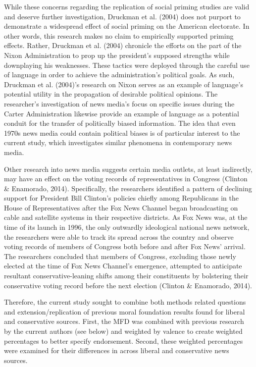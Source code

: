 \documentclass[english,,man]{apa6}
\begin{document}
While these concerns regarding the replication of social priming studies
are valid and deserve further investigation, Druckman et al. (2004) does
not purport to demonstrate a widespread effect of social priming on the
American electorate. In other words, this research makes no claim to
empirically supported priming effects. Rather, Druckman et al. (2004)
chronicle the efforts on the part of the Nixon Administration to prop up
the president's supposed strengths while downplaying his weaknesses.
These tactics were deployed through the careful use of language in order
to achieve the administration's political goals. As such, Druckman et
al. (2004)'s research on Nixon serves as an example of language's
potential utility in the propagation of desirable political opinions.
The researcher's investigation of news media's focus on specific issues
during the Carter Administration likewise provide an example of language
as a potential conduit for the transfer of politically biased
information. The idea that even 1970s news media could contain political
biases is of particular interest to the current study, which
investigates similar phenomena in contemporary news media.

Other research into news media suggests certain media outlets, at least
indirectly, may have an effect on the voting records of representatives
in Congress (Clinton \& Enamorado, 2014). Specifically, the researchers
identified a pattern of declining support for President Bill Clinton's
policies chiefly among Republicans in the House of Representatives after
the Fox News Channel began broadcasting on cable and satellite systems
in their respective districts. As Fox News was, at the time of its
launch in 1996, the only outwardly ideological national news network,
the researchers were able to track its spread across the country and
observe voting records of members of Congress both before and after Fox
News' arrival. The researchers concluded that members of Congress,
excluding those newly elected at the time of Fox News Channel's
emergence, attempted to anticipate resultant conservative-leaning shifts
among their constituents by bolstering their conservative voting record
before the next election (Clinton \& Enamorado, 2014).

Therefore, the current study sought to combine both methods related
questions and extension/replication of previous moral foundation results
found for liberal and conservative sources. First, the MFD was combined
with previous research by the current authors (see below) and weighted
by valence to create weighted percentages to better specify endorsement.
Second, these weighted percentages were examined for their differences
in across liberal and conservative news sources.
\end{document}
